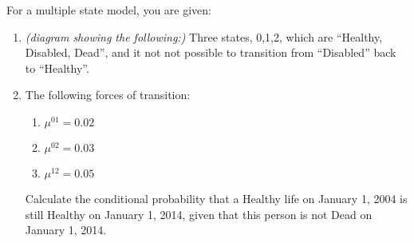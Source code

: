 For a multiple state model, you are given:
\begin{enumerate}
\item {\em (diagram showing the following:)} Three states, 0,1,2, which are ``Healthy, Disabled, Dead'', and it not not possible to transition from ``Disabled'' back to ``Healthy''.
\item The following forces of transition:
   \begin{enumerate}
       \item $\mu^{01} = 0.02 $
       \item $\mu^{02} = 0.03 $
       \item $\mu^{12} = 0.05 $
   \end{enumerate}
   Calculate the conditional probability that a Healthy life on January 1, 2004 is still
   Healthy on January 1, 2014, given that this person is not Dead on January 1, 2014.
   \end{enumerate}



